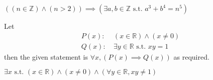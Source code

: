 \begin{questions}
    \item $\left((n \in \mathbb{Z}) \land (n > 2)\right) \implies \left(\exists a, b \in \mathbb{Z} \text{ s.t. } a^3 + b^4 = n^5\right)$

    \item \begin{partquestions}{\roman*}
        \item Let
        \begin{align*}
            P(x):&\ (x \in \mathbb{R}) \land (x \neq 0)\\
            Q(x):&\ \exists y \in \mathbb{R} \text{ s.t. } xy = 1
        \end{align*}
        then the given statement is $\forall x, (P(x) \implies Q(x))$ as required.

        \item $\exists x \text{ s.t. } (x \in \mathbb{R}) \land (x \neq 0) \land (\forall y \in \mathbb{R}, xy \neq 1)$
    \end{partquestions}
\end{questions}

